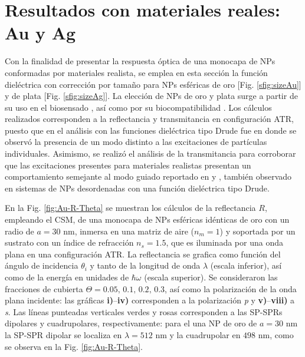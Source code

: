 \section{Resultados con materiales reales: Au y Ag}
\label{section:AuAg}

Con la finalidad de presentar la respuesta óptica de una monocapa de NPs conformadas por materiales realista, se emplea en esta sección la función dieléctrica con corrección por tamaño para NPs esféricas de oro [Fig. \ref{sfig:sizeAu}] y de plata [Fig. \ref{sfig:sizeAg}]. La elección de NPs de oro y plata surge a partir de su uso en el biosensado \cite{jain2008noble}, así como por su biocompatibilidad \cite{fan2009bio,bosetti2002silver}. Los cálculos realizados corresponden a la reflectancia y transmitancia en configuración ATR, puesto que en el análisis con las funciones dieléctrica tipo Drude fue en donde se observó la presencia de un modo distinto a las excitaciones de partículas individuales. Asimismo, se realizó el análisis de la transmitancia para corroborar que las excitaciones presentes para materiales realistas presentan un comportamiento semejante al modo guiado reportado en \cite{kabashin2009plasmonic} y \cite{danilov2018ultra}, también observado en sistemas de NPs desordenadas con una función dieléctrica tipo Drude.

En la Fig.  \ref{fig:Au-R-Theta} se muestran los cálculos de la reflectancia $R$, empleando el CSM, de una monocapa de NPs esféricas idénticas de oro con un radio de $a = 30$ nm, inmersa en una matriz de aire ($n_m = 1$) y soportada por un sustrato con un índice de refracción $n_s = 1.5$, que es iluminada por una onda plana en una configuración ATR. La reflectancia se grafica como función del ángulo de incidencia $\theta_i$ y tanto de la longitud de onda $\lambda$ (escala inferior), así como de la energía en unidades de $\hbar\omega$ (escala superior). Se consideraron las fracciones de cubierta $\Theta = 0.05,\,0.1,\,0.2,\,0.3$, así como la polarización de la onda plana incidente: las gráficas \textbf{i)}--\textbf{iv)} corresponden a la polarización \emph{p} y \textbf{v)}--\textbf{viii)} a \emph{s}. Las líneas punteadas verticales verdes y rosas corresponden a las SP-SPRs dipolares y cuadrupolares, respectivamente: para el una NP de oro de $a= 30$ nm la SP-SPR dipolar se localiza en $\lambda = 512$ nm y la cuadrupolar en $498$ nm, como se observa en la Fig. \ref{fig:Au-R-Theta}.

